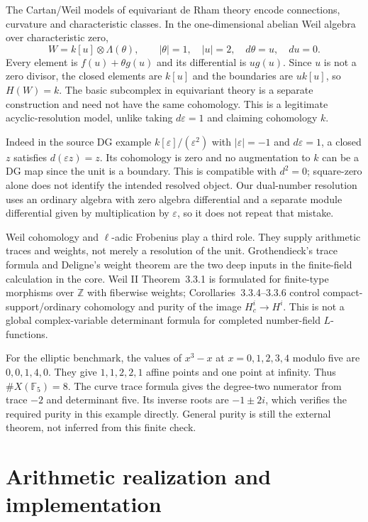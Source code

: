 The Cartan/Weil models of equivariant de Rham theory encode connections, curvature and characteristic classes. In the one-dimensional abelian Weil algebra over characteristic zero,
\[
 W=k[u]\otimes\Lambda(\theta),\qquad |\theta|=1,
 \quad |u|=2,\quad d\theta=u,\quad du=0.
\]
Every element is $f(u)+\theta g(u)$ and its differential is $ug(u)$. Since $u$ is not a zero divisor, the closed elements are $k[u]$ and the boundaries are $uk[u]$, so $H(W)=k$. The basic subcomplex in equivariant theory is a separate construction and need not have the same cohomology. This is a legitimate acyclic-resolution model, unlike taking $d\varepsilon=1$ and claiming cohomology $k$.

Indeed in the source DG example $k[\varepsilon]/(\varepsilon^2)$ with $|\varepsilon|=-1$ and $d\varepsilon=1$, a closed $z$ satisfies $d(\varepsilon z)=z$. Its cohomology is zero and no augmentation to $k$ can be a DG map since the unit is a boundary. This is compatible with $d^2=0$; square-zero alone does not identify the intended resolved object. Our dual-number resolution uses an ordinary algebra with zero algebra differential and a separate module differential given by multiplication by $\varepsilon$, so it does not repeat that mistake.

Weil cohomology and $\ell$-adic Frobenius play a third role. They supply arithmetic traces and weights, not merely a resolution of the unit. Grothendieck's trace formula and Deligne's weight theorem are the two deep inputs in the finite-field calculation in the core. Weil II Theorem~3.3.1 is formulated for finite-type morphisms over $\mathbb Z$ with fiberwise weights; Corollaries~3.3.4--3.3.6 control compact-support/ordinary cohomology and purity of the image $H_c^i\to H^i$. This is not a global complex-variable determinant formula for completed number-field $L$-functions.

For the elliptic benchmark, the values of $x^3-x$ at $x=0,1,2,3,4$ modulo five are $0,0,1,4,0$. They give $1,1,2,2,1$ affine points and one point at infinity. Thus $\#X(\mathbb F_5)=8$. The curve trace formula gives the degree-two numerator from trace $-2$ and determinant five. Its inverse roots are $-1\pm2i$, which verifies the required purity in this example directly. General purity is still the external theorem, not inferred from this finite check.

\section{Arithmetic realization and implementation}
